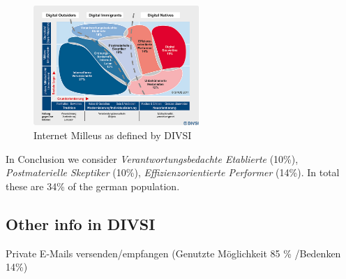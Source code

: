 \begin{figure}[hHtbp]
\centering
\includegraphics[width=0.56\textwidth]{graphix/DIVSI-Kartoffeln.jpg}
\caption{Internet Milleus as defined by DIVSI}
\label{fig:divsi_kartoffeln}
\end{figure}

In Conclusion we consider \textit{Verantwortungsbedachte Etablierte} (10\%),  \textit{Postmaterielle Skeptiker} (10\%),  \textit{Effizienzorientierte Performer} (14\%). In total these are 34\% of the german population.

\subsection{Other info in DIVSI}
Private E-Mails versenden/empfangen (Genutzte Möglichkeit 85 \% \slash Bedenken 14\%)